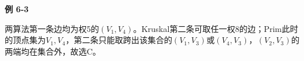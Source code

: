 {\color{ink}\bfseries 例 6-3}\par\vspace{1bp}两算法第一条边均为权5的\((V_{1},\allowbreak{}V_{4})\)。Kruskal第二条可取任一权8的边；Prim此时的顶点集为\({V_{1},\allowbreak{}V_{4}}\)，第二条只能取跨出该集合的\((V_{1},\allowbreak{}V_{3})\)或\((V_{4},\allowbreak{}V_{3})\)，\((V_{2},\allowbreak{}V_{3})\)的两端均在集合外，故选C。
